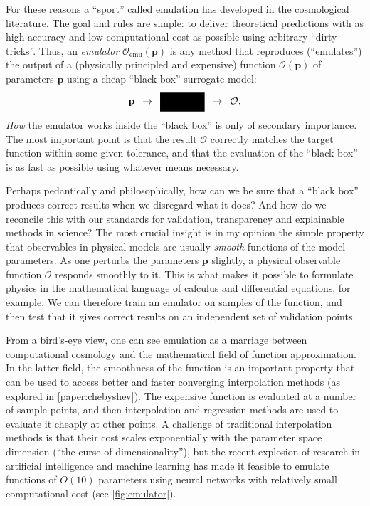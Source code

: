 \documentclass[USenglish, thumbmarks]{uiophdthesis} %
\begin{document}
For these reasons a \enquote{sport} called emulation has developed in the cosmological literature.
The goal and rules are simple: to deliver theoretical predictions
with as high accuracy and low computational cost as possible
using arbitrary \enquote{dirty tricks}.
Thus, an \emph{emulator} $\mathcal{O}_\text{emu}(\mathbf{p})$ is any method that reproduces (\enquote{emulates})
the output of a (physically principled and expensive) function $\mathcal{O}(\mathbf{p})$
of parameters $\mathbf{p}$ using a cheap \enquote{black box} surrogate model:
\newcommand\blackbox{\ensuremath{\vcenter{\hbox{\rule{4.5em}{2em}}}}} %
\begin{equation}
\mathbf{p} \,\,\,\to\,\,\, \blackbox \,\,\,\to\,\,\, \mathcal{O} .
\end{equation}
\emph{How} the emulator works inside the \enquote{black box} is only of secondary importance.
The most important point is that the result $\mathcal{O}$ correctly matches the target function within some given tolerance,
and that the evaluation of the \enquote{black box} is as fast as possible using whatever means necessary.

Perhaps pedantically and philosophically,
how can we be sure that a \enquote{black box} produces correct results when we disregard what it does?
And how do we reconcile this with our standards for validation, transparency and explainable methods in science?
The most crucial insight is in my opinion the simple property that observables in physical models
are usually \emph{smooth} functions of the model parameters.
As one perturbs the parameters $\mathbf{p}$ slightly,
a physical observable function $\mathcal{O}$ responds smoothly to it.
This is what makes it possible to formulate physics in the mathematical language of calculus and differential equations, for example.
We can therefore train an emulator on samples of the function,
and then test that it gives correct results on an independent set of validation points.

From a bird's-eye view,
one can see emulation as a marriage between computational cosmology
and the mathematical field of function approximation.
In the latter field, the smoothness of the function is an important property
that can be used to access better and faster converging interpolation methods
(as explored in \cref{paper:chebyshev}).
The expensive function is evaluated at a number of sample points,
and then interpolation and regression methods are used to evaluate it cheaply at other points.
A challenge of traditional interpolation methods is that their cost scales exponentially with the parameter space dimension
(\enquote{the curse of dimensionality}),
but the recent explosion of research in artificial intelligence and machine learning has made it feasible to emulate functions of
$O(10)$ parameters using neural networks with relatively small computational cost (see \cref{fig:emulator}).
\end{document}
